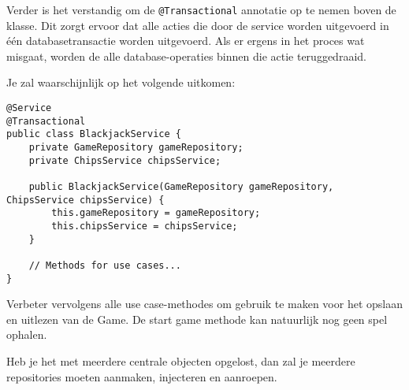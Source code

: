 Verder is het verstandig om de \texttt{@Transactional} annotatie 
op te nemen boven de klasse. Dit zorgt ervoor dat alle acties 
die door de service worden uitgevoerd in één databasetransactie 
worden uitgevoerd. Als er ergens in het proces wat misgaat, worden 
de alle database-operaties binnen die actie teruggedraaid.

Je zal waarschijnlijk op het volgende uitkomen:
\begin{verbatim}
@Service
@Transactional
public class BlackjackService {
    private GameRepository gameRepository;
    private ChipsService chipsService;

    public BlackjackService(GameRepository gameRepository, ChipsService chipsService) {
        this.gameRepository = gameRepository;
        this.chipsService = chipsService;
    }
    
    // Methods for use cases...
}
\end{verbatim}

Verbeter vervolgens alle use case-methodes om gebruik te maken voor het 
opslaan en uitlezen van de Game. De start game methode kan natuurlijk nog geen 
spel ophalen.

Heb je het met meerdere centrale objecten opgelost, 
dan zal je meerdere repositories moeten 
aanmaken, injecteren en aanroepen.